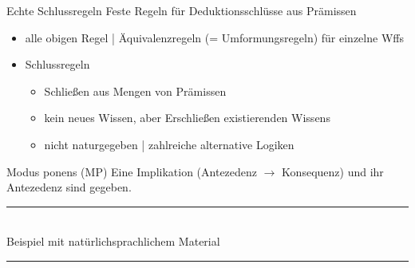 \begin{frame}
  {Echte Schlussregeln}
  \onslide<+->
  \onslide<+->
  Feste Regeln für \alert{Deduktionsschlüsse aus Prämissen}\\
  \Halbzeile
  \begin{itemize}[<+->]
    \item alle obigen Regel | \alert{Äquivalenzregeln} (= Umformungsregeln) für einzelne Wffs
    \item Schlussregeln
      \begin{itemize}[<+->]
        \item Schließen aus \alert{Mengen von Prämissen}
        \item kein neues Wissen, aber \alert{Erschließen existierenden Wissens}
        \item nicht naturgegeben | zahlreiche \alert{alternative Logiken}
      \end{itemize}
  \end{itemize}
\end{frame}

\begin{frame}
  {Modus ponens (MP)}
  \onslide<+->
  \onslide<+->
  Eine \alert{Implikation} (Antezedenz $\rightarrow$ Konsequenz) und \alert{ihr Antezedenz} sind gegeben.\\
  \onslide<+->
  \Zeile
  \rule{3em}{0em}\\
  \Doppelzeile 
  \onslide<+->
  Beispiel mit natürlichsprachlichem Material\\
  \Zeile
  \rule{3em}{0em}
\end{frame}

